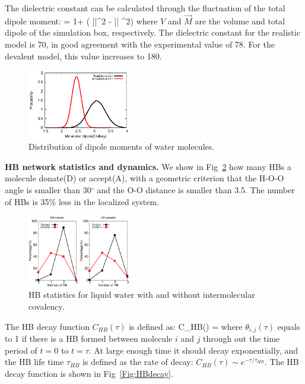 \documentclass[aps,prl,reprint,amsmath,amssymb]{revtex4-1}
\begin{document}
The dielectric constant can be calculated through the fluctuation of the total dipole moment\cite{neumann1983dipole,adams1981theory}:
%
\bea
\epsilon = 1+  (  \langle ||^2 \rangle  - \langle || \rangle ^2) \label{Eq:dielectric}
\eea
%
where $V$ and $\vec{M}$ are the volume and total dipole of the simulation box, respectively. 
The dielectric constant for the realistic model is 70, in good agreement with the experimental value of 78. 
For the devalent model, this value increases to 180.


\begin{figure}
\includegraphics[width=0.4\textwidth]{new_dipole}
\caption{Distribution of dipole moments of water molecules.} \label{Fig:dipoledist}
\end{figure}

\textbf{HB network statistics and dynamics.} We show in Fig~\ref{fig:HBstat} how many HBs a molecule donate(D) or accept(A), with a geometric criterion that the H-O-O angle is smaller than 30$^{\circ}$ and the O-O distance is smaller than 3.5\Ang. 
The number of HBs is 35\% less in the localized system.

\begin{figure}
\includegraphics[width=0.4\textwidth]{new_hbstat}
\caption{HB statistics for liquid water with and without intermolecular covalency.}\label{fig:HBstat}
\end{figure}

The HB decay function $C_{HB}(\tau)$ is defined as:
\bea
C_{HB}(\tau) =  \label{Eq:HBdecay}
\eea
where $\theta_{i,j}(\tau)$ equals to 1 if there is a HB formed between molecule $i$ and $j$ through out the time period of $t=0$ to $t=\tau$. 
At large enough time it should decay exponentially, and the HB life time $\tau_{HB}$ is defined as the rate of decay: $C_{HB}(\tau) \sim e^{-\tau/\tau_{HB}}$. 
The HB decay function is shown in Fig~\ref{Fig:HBdecay}.
\end{document}
